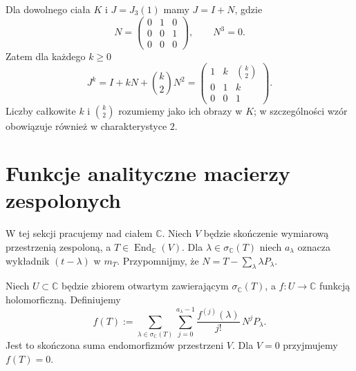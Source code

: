 \begin{przyklad}
\label{prz:lin18-jordan-powers}
Dla dowolnego ciała \(K\)
i \(J=J_3(1)\) mamy \(J=I+N\), gdzie
\[
 N=\begin{pmatrix}0&1&0\\0&0&1\\0&0&0\end{pmatrix},
 \qquad N^3=0.
\]
Zatem dla każdego \(k\ge0\)
\[
 J^k=I+kN+\binom{k}{2}N^2
 =\begin{pmatrix}
 1&k&\binom{k}{2}\\
 0&1&k\\
 0&0&1
 \end{pmatrix}.
\]
Liczby całkowite \(k\) i
\(\binom{k}{2}\) rozumiemy jako ich obrazy w \(K\);
w szczególności wzór obowiązuje również
w charakterystyce \(2\).
\end{przyklad}

\section{Funkcje analityczne macierzy zespolonych}
\label{sec:lin18-analytic-functions}

W tej sekcji pracujemy nad ciałem \(\mathbb C\).
Niech \(V\) będzie skończenie wymiarową
przestrzenią zespoloną, a
\(T\in\operatorname{End}_{\mathbb C}(V)\).
Dla \(\lambda\in\sigma_{\mathbb C}(T)\)
niech \(a_\lambda\) oznacza wykładnik
\((t-\lambda)\) w \(m_T\).
Przypomnijmy, że
\(N=T-\sum_\lambda\lambda P_\lambda\).

\begin{definicja}
\label{def:lin18-analytic-calculus}
Niech \(U\subset\mathbb C\)
będzie zbiorem otwartym zawierającym
\(\sigma_{\mathbb C}(T)\),
a \(f\colon U\to\mathbb C\)
funkcją holomorficzną.
Definiujemy
\[
 f(T):=
 \sum_{\lambda\in\sigma_{\mathbb C}(T)}
 \sum_{j=0}^{a_\lambda-1}
 \frac{f^{(j)}(\lambda)}{j!}\,N^jP_\lambda.
\]
Jest to skończona suma
endomorfizmów przestrzeni \(V\).
Dla \(V=0\) przyjmujemy \(f(T)=0\).
\end{definicja}

